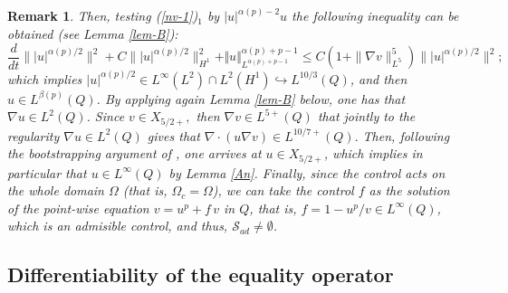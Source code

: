 \documentclass[11pt,reqno]{amsart}%
\newtheorem{remark}{Remark}[section]
\numberwithin{equation}{section}
\begin{document}
{\begin{remark}
Then, testing (\ref{nv-1})$_1$ by $|u|^{\alpha(p)-2}u$ the following inequality can be obtained (see  Lemma \ref{lem-B}):
$$
\frac{d}{dt}\| |u|^{\alpha(p)/2}\|^2+C\| |u|^{\alpha(p)/2} \|^2_{H^1}+\Vert u\Vert_{L^{\alpha(p)+p-1}}^{\alpha(p)+p-1}\le C\left(1+\|\nabla v\|^5_{L^5}\right)\| |u|^{\alpha(p)/2} \|^2;
$$
which implies $|u|^{\alpha(p)/2}\in L^\infty(L^2)\cap L^2(H^1)\hookrightarrow L^{10/3}(Q)$, and then $u\in L^{\beta(p)}(Q)$.
By applying again Lemma \ref{lem-B} below, one has that $\nabla u\in L^2(Q)$. 
Since  $v\in X_{5/2+},$ then $\nabla v\in L^{5+}(Q)$  that jointly to the regularity $\nabla u\in L^2(Q)$ gives that $\nabla\cdot(u\nabla v)\in L^{10/7+}(Q).$
 Then, following the bootstrapping argument of \cite[Theorem 3.3]{Andre_SICOM}, 
 one arrives at $u\in X_{5/2+}$, which implies in particular that  $u\in L^\infty(Q)$ by Lemma \ref{An}. 
 Finally, since the control acts on the whole domain $\Omega$ (that is, $\Omega_c=\Omega$),  
 we can take the control $f$ as the solution of the point-wise equation 
$v=u^p+f\, v$ in $Q$, 
that is, $f=1-u^p/v \in L^\infty(Q)$,  which is an admisible control, and thus,  $\mathcal{S}_{ad}\ne\emptyset$.


\end{remark}

 
 \subsection{Differentiability of the equality operator}

 \
 
 
}
\end{document}

